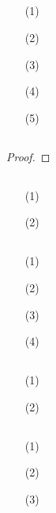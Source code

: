 \documentclass[UTF8]{ctexart}
\begin{document}
\subsection{}   %
\begin{enumerate}
    \item [(1)]
    \item [(2)]
    \item [(3)]
    \item [(4)]
    \item [(5)]
\end{enumerate}

\subsection{}   %
\begin{proof}
    
\end{proof}

\subsection{}   %
\begin{enumerate}
    \item [(1)]
    \item [(2)]
\end{enumerate}

\subsection{}   %
\begin{enumerate}
    \item [(1)]
    \item [(2)]
    \item [(3)]
    \item [(4)]
\end{enumerate}

\subsection{}   %
\begin{enumerate}
    \item [(1)]
    \item [(2)]
\end{enumerate}

\subsection{}   %
\begin{enumerate}
    \item [(1)]
    \item [(2)]
    \item [(3)]
\end{enumerate}
\end{document}
